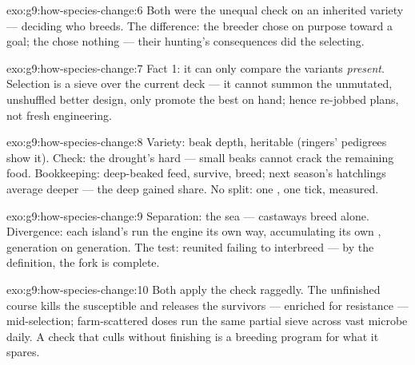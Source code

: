 \begin{solution}{exo:g9:how-species-change:6}
Both were the unequal check on an inherited variety ---
deciding who breeds. The difference: the breeder chose on
purpose toward a goal; the  chose nothing --- their
hunting's consequences did the selecting.
\end{solution}

\begin{solution}{exo:g9:how-species-change:7}
Fact 1: it can only compare the variants \emph{present}.
Selection is a sieve over the current deck --- it cannot
summon the unmutated, unshuffled better design, only
promote the best on hand; hence re-jobbed  plans, not
fresh engineering.
\end{solution}

\begin{solution}{exo:g9:how-species-change:8}
Variety: beak depth, heritable (ringers' pedigrees show
it). Check: the drought's hard  --- small beaks
cannot crack the remaining food. Bookkeeping: deep-beaked
 feed, survive, breed; next season's hatchlings
average deeper --- the deep  gained share. No
split: one , one tick, measured.
\end{solution}

\begin{solution}{exo:g9:how-species-change:9}
Separation: the sea --- castaways breed alone. Divergence:
each island's  run the engine its own way,
accumulating its own , generation on generation.
The test: reunited  failing to interbreed --- by the
 definition, the fork is complete.
\end{solution}

\begin{solution}{exo:g9:how-species-change:10}
Both apply the check raggedly. The unfinished course
kills the susceptible and releases the survivors ---
enriched for resistance --- mid-selection; farm-scattered
doses run the same partial sieve across vast microbe
 daily. A check that culls without finishing
is a breeding program for what it spares.
\end{solution}

